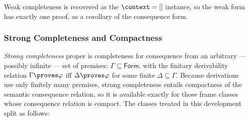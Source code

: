 \documentclass[../BimodalReference.tex]{subfiles}
\begin{document}
Weak completeness is recovered as the $\context = []$ instance, so the weak form has exactly
one proof, as a corollary of the consequence form.

\subsubsection{Strong Completeness and Compactness}

\emph{Strong completeness} proper is completeness for consequence from an arbitrary ---
possibly infinite --- set of premises: $\Gamma \subseteq \mathsf{Form}$, with the finitary
derivability relation $\Gamma \proves \varphi$ iff $\Delta \proves \varphi$ for some finite
$\Delta \subseteq \Gamma$.
Because derivations use only finitely many premises, strong completeness entails compactness of
the semantic consequence relation, so it is available exactly for those frame classes whose
consequence relation is compact.
The classes treated in this development split as follows:
\end{document}
